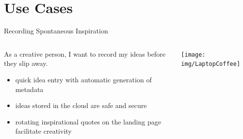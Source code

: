 \section{Use Cases}

\begin{frame}{Recording Spontaneous Inspiration}
\begin{columns}
\begin{column}{0.5\textwidth}
As a creative person, I want to record my ideas before they slip away.
\begin{itemize}
\item quick idea entry with automatic generation of metadata
\item ideas stored in the cloud are safe and secure
\item rotating inspirational quotes on the landing page facilitate creativity
\end{itemize}
\end{column}
\begin{column}{0.5\textwidth}  %
    \begin{center}
     \texttt{[image: img/LaptopCoffee]}
     \end{center}
\end{column}
\end{columns}
\end{frame}

